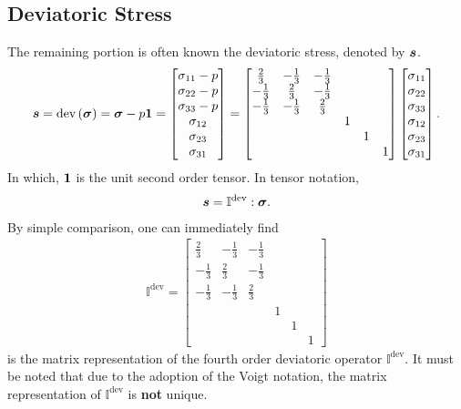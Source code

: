 \subsection{Deviatoric Stress}
The remaining portion is often known the deviatoric stress, denoted by $\bm{s}$.
\begin{gather}
\bm{s}=\text{dev}\left(\bm{\sigma}\right)=\bm{\sigma}-p\bm{1}=\begin{bmatrix}
\sigma_{11}-p\\\sigma_{22}-p\\\sigma_{33}-p\\\sigma_{12}\\\sigma_{23}\\\sigma_{31}
\end{bmatrix}=\begin{bmatrix}
\frac{2}{3}&-\frac{1}{3}&-\frac{1}{3}&&&\\
-\frac{1}{3}&\frac{2}{3}&-\frac{1}{3}&&&\\
-\frac{1}{3}&-\frac{1}{3}&\frac{2}{3}&&&\\
&&&1&&\\
&&&&1&\\
&&&&&1
\end{bmatrix}\begin{bmatrix}
\sigma_{11}\\\sigma_{22}\\\sigma_{33}\\\sigma_{12}\\\sigma_{23}\\\sigma_{31}
\end{bmatrix}.
\end{gather}
In which, $\bm{1}$ is the unit second order tensor. In tensor notation,
\begin{gather}
\bm{s}=\mathbb{I}^\text{dev}:\bm{\sigma}.
\end{gather}
By simple comparison, one can immediately find
\begin{gather}
\mathbb{I}^\text{dev}=\begin{bmatrix}
\frac{2}{3}&-\frac{1}{3}&-\frac{1}{3}&&&\\
-\frac{1}{3}&\frac{2}{3}&-\frac{1}{3}&&&\\
-\frac{1}{3}&-\frac{1}{3}&\frac{2}{3}&&&\\
&&&1&&\\
&&&&1&\\
&&&&&1
\end{bmatrix}
\end{gather}
is the matrix representation of the fourth order deviatoric operator $\mathbb{I}^\text{dev}$. It must be noted that due to the adoption of the Voigt notation, the matrix representation of $\mathbb{I}^\text{dev}$ is \textbf{not} unique.
